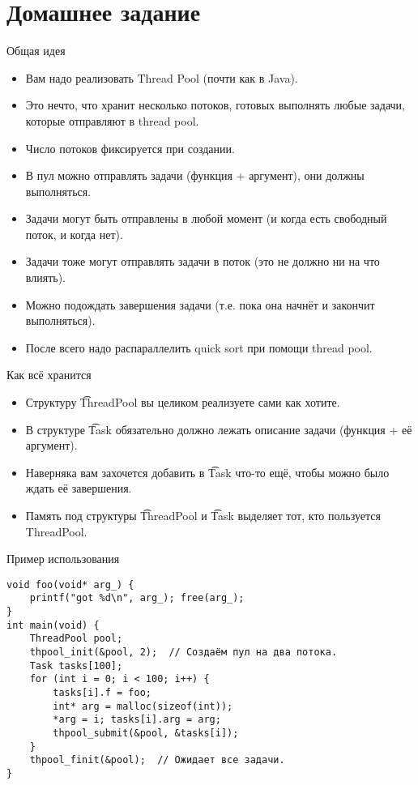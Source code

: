 \section{Домашнее задание}

\begin{frame}{Общая идея}
	\begin{itemize}
		\item Вам надо реализовать Thread Pool (почти как в Java).
		\item Это нечто, что хранит несколько потоков, готовых выполнять любые задачи, которые отправляют в thread pool.
		\item Число потоков фиксируется при создании.
		\item В пул можно отправлять задачи (функция + аргумент), они должны выполняться.
		\item Задачи могут быть отправлены в любой момент (и когда есть свободный поток, и когда нет).
		\item Задачи тоже могут отправлять задачи в поток (это не должно ни на что влиять).
		\item Можно подождать завершения задачи (т.е. пока она начнёт и закончит выполняться).
		\item После всего надо распараллелить quick sort при помощи thread pool.
	\end{itemize}
\end{frame}

\begin{frame}{Как всё хранится}
	\begin{itemize}
		\item Структуру \t{ThreadPool} вы целиком реализуете сами как хотите.
		\item В структуре \t{Task} обязательно должно лежать описание задачи (функция + её аргумент).
		\item Наверняка вам захочется добавить в \t{Task} что-то ещё, чтобы можно было ждать её завершения.
		\item Память под структуры \t{ThreadPool} и \t{Task} выделяет тот, кто пользуется ThreadPool.
	\end{itemize}
\end{frame}

\begin{frame}[fragile]{Пример использования}
\begin{verbatim}
void foo(void* arg_) {
    printf("got %d\n", arg_); free(arg_);
}
int main(void) {
    ThreadPool pool;
    thpool_init(&pool, 2);  // Создаём пул на два потока.
    Task tasks[100];
    for (int i = 0; i < 100; i++) {
        tasks[i].f = foo;
        int* arg = malloc(sizeof(int));
        *arg = i; tasks[i].arg = arg;
        thpool_submit(&pool, &tasks[i]);
    }
    thpool_finit(&pool);  // Ожидает все задачи.
}
\end{verbatim}
\end{frame}

